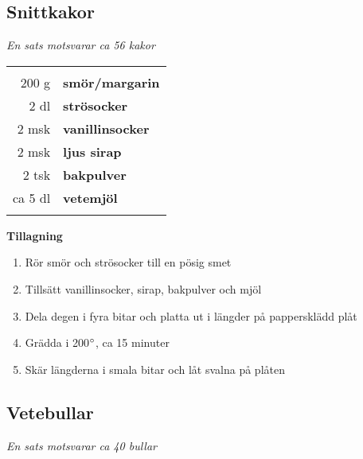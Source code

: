 \documentclass[a4paper,12pt]{article}
\newcommand{\sats}[1]{\noindent \textit{En sats motsvarar #1}}
\begin{document}
\clearpage

\subsection{Snittkakor}
\sats{ca 56 kakor}

\begin{table}[H]
	\begin{tabular}{rl}
	\hline
	&\\
		200 g & \textbf{smör/margarin}\\
		2 dl & \textbf{strösocker}\\
		2 msk & \textbf{vanillinsocker}\\
		2 msk & \textbf{ljus sirap}\\
		2 tsk & \textbf{bakpulver}\\
		ca 5 dl & \textbf{vetemjöl}\\
	&\\
	\hline
	\end{tabular}
\end{table}

\begin{multicols*}{2}

\noindent \textbf{Tillagning}
\begin{enumerate}
	\itemsep0cm
	\item Rör smör och strösocker till en pösig smet
	\item Tillsätt vanillinsocker, sirap, bakpulver och mjöl
	\item Dela degen i fyra bitar och \mbox{platta} ut i längder på pappersklädd plåt
	\item Grädda i 200$\degree$, ca 15 minuter
	\item Skär längderna i smala bitar och låt svalna på plåten
\end{enumerate}

\end{multicols*}

\clearpage

\subsection{Vetebullar}
\sats{ca 40 bullar}
\end{document}
